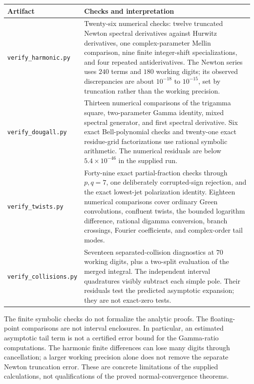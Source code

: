\documentclass[11pt,a4paper]{article}
\numberwithin{equation}{section}
\theoremstyle{definition}
\theoremstyle{remark}
\newcommand{\src}[1]{\nolinkurl{#1}}
\begin{document}
\begin{longtable}{@{}>{\raggedright\arraybackslash}p{}>{\raggedright\arraybackslash}p{}@{}}
\toprule
Artifact & Checks and interpretation\\
\midrule
\endhead
\src{verify_harmonic.py}
& Twenty-six numerical checks: twelve truncated Newton spectral
derivatives against Hurwitz derivatives, one complex-parameter
Mellin comparison, nine finite integer-shift specializations,
and four repeated antiderivatives. The Newton series uses
$240$ terms and $180$ working digits; its observed discrepancies
are about $10^{-18}$ to $10^{-15}$, set by truncation rather
than the working precision.\\[6pt]
\src{verify_dougall.py}
& Thirteen numerical comparisons of the trigamma square,
two-parameter Gamma identity, mixed spectral generator, and first
spectral derivative. Six exact Bell-polynomial checks and
twenty-one exact residue-grid factorizations use rational
symbolic arithmetic. The numerical residuals are below
$5.4\times10^{-46}$ in the supplied run.\\[6pt]
\src{verify_twists.py}
& Forty-nine exact partial-fraction checks through $p,q=7$,
one deliberately corrupted-sign rejection, and the exact
lowest-jet polarization identity. Eighteen numerical comparisons
cover ordinary Green convolutions, confluent twists, the bounded
logarithm difference, rational digamma conversion, branch
crossings, Fourier coefficients, and complex-order tail modes.\\[6pt]
\src{verify_collisions.py}
& Seventeen separated-collision diagnostics at $70$ working
digits, plus a two-split evaluation of the merged integral.
The independent interval quadratures visibly subtract each
simple pole. Their residuals test the predicted asymptotic
expansion; they are not exact-zero tests.\\
\bottomrule
\end{longtable}

The finite symbolic checks do not formalize the analytic proofs.
The floating-point comparisons are not interval enclosures.
In particular, an estimated asymptotic tail term is not a
certified error bound for the Gamma-ratio computations.
The harmonic finite differences can lose many digits through
cancellation; a larger working precision alone does not remove
the separate Newton truncation error. These are concrete
limitations of the supplied calculations, not qualifications
of the proved normal-convergence theorems.
\end{document}
